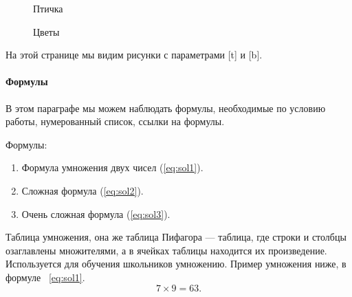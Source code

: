 \documentclass[a4paper,12pt]{article}         %
\begin{document}
\begin{figure}[t]
	\caption{Птичка}
	\label{fig:i2}
\end{figure}
\begin{figure}[b]
	\caption{Цветы}
	\label{fig:i3}
\end{figure}
\newpage
На этой странице мы видим рисунки с параметрами [t] и [b].
\newpage

\paragraph{Формулы}
В этом параграфе мы можем наблюдать формулы, необходимые по условию работы, нумерованный список, ссылки на формулы.

Формулы:
\begin{enumerate} 
	\item Формула  умножения двух чисел (\ref{eq:sol1}).
	\item Сложная формула (\ref{eq:sol2}).
	\item Очень сложная формула (\ref{eq:sol3}).
\end{enumerate}
Таблица умножения, она же таблица Пифагора — таблица, где строки и столбцы озаглавлены множителями, а в ячейках таблицы находится их произведение. Используется для обучения школьников умножению. Пример умножения ниже, в формуле ~\ref{eq:sol1}.
\begin{equation}
\label{eq:sol1}
7\times9=63.
\end{equation}
\end{document}
